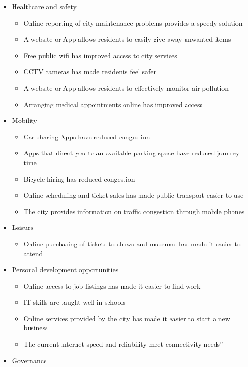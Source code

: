 \documentclass[
  english,
  12pt,
  a4paper,
]{scrartcl}
\providecommand{\tightlist}{%
  \setlength{\itemsep}{0pt}\setlength{\parskip}{0pt}}
\begin{document}
\begin{itemize}
\tightlist
\item
  Healthcare and safety

  \begin{itemize}
  \tightlist
  \item
    Online reporting of city maintenance problems provides a speedy
    solution
  \item
    A website or App allows residents to easily give away unwanted items
  \item
    Free public wifi has improved access to city services
  \item
    CCTV cameras has made residents feel safer
  \item
    A website or App allows residents to effectively monitor air
    pollution
  \item
    Arranging medical appointments online has improved access
  \end{itemize}
\item
  Mobility

  \begin{itemize}
  \tightlist
  \item
    Car-sharing Apps have reduced congestion
  \item
    Apps that direct you to an available parking space have reduced
    journey time
  \item
    Bicycle hiring has reduced congestion
  \item
    Online scheduling and ticket sales has made public transport easier
    to use
  \item
    The city provides information on traffic congestion through mobile
    phones
  \end{itemize}
\item
  Leisure

  \begin{itemize}
  \tightlist
  \item
    Online purchasing of tickets to shows and museums has made it easier
    to attend
  \end{itemize}
\item
  Personal development opportunities

  \begin{itemize}
  \tightlist
  \item
    Online access to job listings has made it easier to find work
  \item
    IT skills are taught well in schools
  \item
    Online services provided by the city has made it easier to start a
    new business
  \item
    The current internet speed and reliability meet connectivity needs''
  \end{itemize}
\item
  Governance


\end{itemize}
\end{document}
